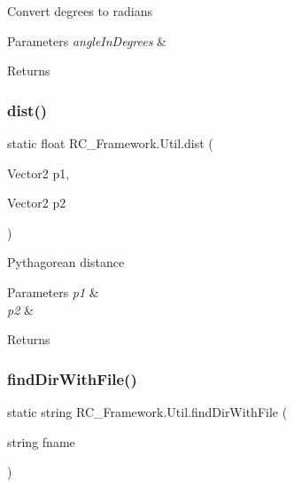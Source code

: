Convert degrees to radians 


\begin{DoxyParams}{Parameters}
{\em angle\+In\+Degrees} & \\
\hline
\end{DoxyParams}
\begin{DoxyReturn}{Returns}

\end{DoxyReturn}
\mbox{\label{class_r_c___framework_1_1_util_ab64b89f35cd444e0de8ff911c7eb97ae}} 
\subsubsection{\texorpdfstring{dist()}{dist()}}
{\footnotesize\ttfamily static float R\+C\+\_\+\+Framework.\+Util.\+dist (\begin{DoxyParamCaption}\item[{Vector2}]{p1,  }\item[{Vector2}]{p2 }\end{DoxyParamCaption})\hspace{0.3cm}{\ttfamily [static]}}



Pythagorean distance 


\begin{DoxyParams}{Parameters}
{\em p1} & \\
\hline
{\em p2} & \\
\hline
\end{DoxyParams}
\begin{DoxyReturn}{Returns}

\end{DoxyReturn}
\mbox{\label{class_r_c___framework_1_1_util_a554f5a1c79d41198bdc7314da7394c1d}} 
\subsubsection{\texorpdfstring{find\+Dir\+With\+File()}{findDirWithFile()}}
{\footnotesize\ttfamily static string R\+C\+\_\+\+Framework.\+Util.\+find\+Dir\+With\+File (\begin{DoxyParamCaption}\item[{string}]{fname }\end{DoxyParamCaption})\hspace{0.3cm}{\ttfamily [static]}}




